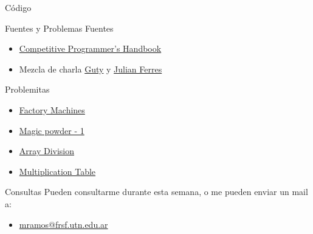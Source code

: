\documentclass{beamer}
\begin{document}
\begin{frame}{Código}
	\ventanaDeslizanteDOSSUM
\end{frame}



\begin{frame}{Fuentes y Problemas}
    Fuentes
    \begin{itemize}
        \item \href{https://cses.fi/book/book.pdf}{Competitive Programmer's Handbook}
        \item Mezcla de charla \href{https://www.pc-arg.com/media/attachment/binary_twopointers.pdf}{Guty} y \href{https://www.pc-arg.com/media/attachment/bs-sorting-2022.pdf}{Julian Ferres}
    \end{itemize}
    Problemitas
    \begin{itemize}
        \item \href{https://cses.fi/problemset/task/1620}{Factory Machines}
        \item \href{https://codeforces.com/problemset/problem/670/D1}{Magic powder - 1}
        \item \href{https://cses.fi/problemset/task/1085}{Array Division}
        \item \href{https://cses.fi/problemset/task/2422}{Multiplication Table}
    \end{itemize}

\end{frame}


\begin{frame}{Consultas}
Pueden consultarme durante esta semana, o me pueden enviar un mail a:
        \begin{itemize}
            \item \href{mailto:mramos@frsf.utn.edu.ar}{mramos@frsf.utn.edu.ar}
        \end{itemize}
\end{frame}
\end{document}
